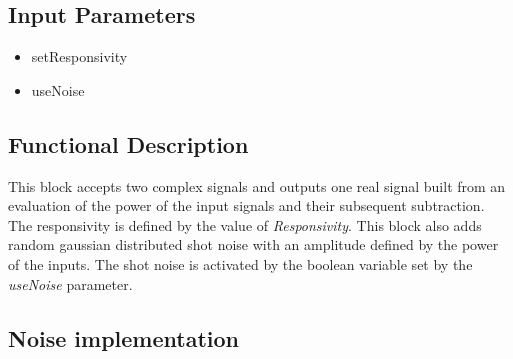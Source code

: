 \documentclass[../../sdf/tex/BPSK_system.tex]{subfiles}
\date{}
\begin{document}
\onlyinsubfile{\maketitle}

\subsection*{Input Parameters}

\begin{multicols}{2}
	\begin{itemize}
		\item setResponsivity
		\item useNoise
	\end{itemize}
\end{multicols}

\subsection*{Functional Description}

This block accepts two complex signals and outputs one real signal built from an evaluation of the power of the input signals and their subsequent subtraction. The responsivity is defined by the value of \textit{Responsivity}. This block also adds random gaussian distributed shot noise with an amplitude defined by the power of the inputs. The shot noise is activated by the boolean variable set by the \textit{useNoise} parameter.


\subsection*{Noise implementation}
\end{document}
